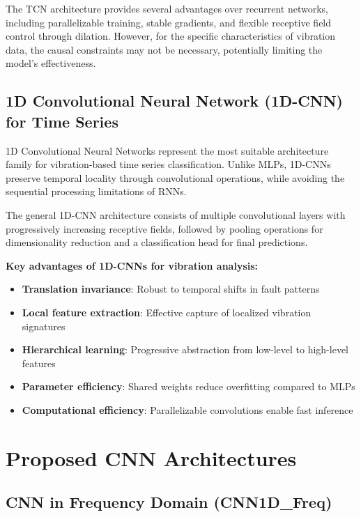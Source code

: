 \documentclass[12pt]{article}
\begin{document}
The TCN architecture provides several advantages over recurrent networks, including parallelizable training, stable gradients, and flexible receptive field control through dilation. However, for the specific characteristics of vibration data, the causal constraints may not be necessary, potentially limiting the model's effectiveness.

\subsection{1D Convolutional Neural Network (1D-CNN) for Time Series}

1D Convolutional Neural Networks represent the most suitable architecture family for vibration-based time series classification. Unlike MLPs, 1D-CNNs preserve temporal locality through convolutional operations, while avoiding the sequential processing limitations of RNNs.

The general 1D-CNN architecture consists of multiple convolutional layers with progressively increasing receptive fields, followed by pooling operations for dimensionality reduction and a classification head for final predictions.

\textbf{Key advantages of 1D-CNNs for vibration analysis:}
\begin{itemize}
    \item \textbf{Translation invariance}: Robust to temporal shifts in fault patterns
    \item \textbf{Local feature extraction}: Effective capture of localized vibration signatures
    \item \textbf{Hierarchical learning}: Progressive abstraction from low-level to high-level features
    \item \textbf{Parameter efficiency}: Shared weights reduce overfitting compared to MLPs
    \item \textbf{Computational efficiency}: Parallelizable convolutions enable fast inference
\end{itemize}

\section{Proposed CNN Architectures}

\subsection{CNN in Frequency Domain (CNN1D\_Freq)}
\end{document}
